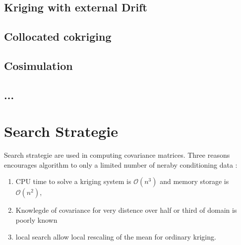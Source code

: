 \documentclass[twocolumn]{article}
\numberwithin{equation}{section}
\begin{document}
\subsection{Kriging with external Drift}

\subsection{Collocated cokriging}

\subsection{Cosimulation}

\subsection{...}



\section{Search Strategie}
Search strategie  are used in computing covariance matrices. Three reasons encourages algorithm to only a limited number of neraby conditioning data : 
\begin{enumerate}
	\item CPU time to solve a kriging system is $\mathcal{O}({n^3})$ and memory storage is $\mathcal{O}({n^2})$,
	\item Knowlegde of covariance for very distence over half or third of domain is poorly known 
	\item  local search allow local rescaling of the mean for ordinary kriging.
\end{enumerate} 
 
\end{document}
